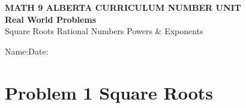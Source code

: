 \documentclass[11pt, a4paper]{article}
\newcommand{\blank}[1]{\underline{\hspace{#1}}}
\begin{document}

\begin{tcolorbox}[colback=accentlight, colframe=accent, leftrule=5pt,
    toprule=0.6pt, bottomrule=0.6pt, rightrule=0.6pt,
    top=8pt, bottom=8pt, left=12pt]
  {\small\bfseries\color{accent}MATH 9 \textperiodcentered{}
    ALBERTA CURRICULUM \textperiodcentered{} NUMBER UNIT}\\[4pt]
  {\LARGE\bfseries Real World Problems}\\[3pt]
  {\small\color{slate}Square Roots \textperiodcentered{} Rational Numbers
    \textperiodcentered{} Powers \& Exponents}
\end{tcolorbox}

\vspace{4pt}
\noindent Name:\;\blank{7cm}\hfill Date:\;\blank{4cm}
\vspace{10pt}


\section*{Problem 1 \hfill \normalfont\small\color{slate}Square Roots}
\end{document}
